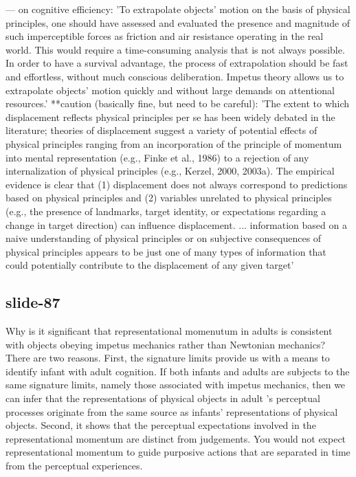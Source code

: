 \documentclass[12pt,\papersize]{extarticle}
\begin{document}
--- on cognitive efficiency: 'To extrapolate objects’ motion on the basis of physical principles, one should have assessed and evaluated the presence and magnitude of such imperceptible forces as friction and air resistance operating in the real world. This would require a time-consuming analysis that is not always possible. In order to have a survival advantage, the process of extrapolation should be fast and effortless, without much conscious deliberation. Impetus theory allows us to extrapolate objects’ motion quickly and without large demands on attentional resources.' \citep[p.\ 450]{kozhevnikov:2001_impetus}
**caution (basically fine, but need to be careful): 'The extent to which displacement reflects physical principles per se has been widely debated in the literature; theories of displacement suggest a variety of potential effects of physical principles ranging from an incorporation of the principle of momentum into mental representation (e.g., Finke et al., 1986) to a rejection of any internalization of physical principles (e.g., Kerzel, 2000, 2003a). The empirical evidence is clear that (1) displacement does not always correspond to predictions based on physical principles and (2) variables unrelated to physical principles (e.g., the presence of landmarks, target identity, or expectations regarding a change in target direction) can influence displacement. ... information based on a naive understanding of physical principles or on subjective consequences of physical principles appears to be just one of many types of information that could potentially contribute to the displacement of any given target' \citep[p.\ 842]{hubbard:2005_representational}
 
 
\subsection{slide-87}
Why is it significant that representational momenutum in adults is consistent with objects obeying impetus mechanics rather than Newtonian mechanics?
There are two reasons.
First, the signature limits provide us with a means to identify infant with adult cognition. If both infants and adults are subjects to the same signature limits, namely those associated with impetus mechanics, then we can infer that the representations of physical objects in adult 's perceptual processes originate from the same source as infants' representations of physical objects.
Second, it shows that the perceptual expectations involved in the representational momentum are distinct from judgements. You would not expect representational momentum to guide purposive actions that are separated in time from the perceptual experiences.
 
\end{document}
